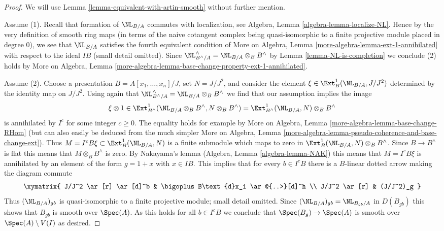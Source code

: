 \begin{proof}
We will use Lemma \ref{lemma-equivalent-with-artin-smooth}
without further mention.

\medskip\noindent
Assume (1). Recall that formation of $\NL_{B/A}$ commutes with
localization, see Algebra, Lemma \ref{algebra-lemma-localize-NL}.
Hence by the very definition of smooth ring maps (in terms of
the naive cotangent complex being quasi-isomorphic to a finite
projective module placed in degree $0$), we see that
$\NL_{B/A}$ satisfies the fourth equivalent condition
of More on Algebra, Lemma \ref{more-algebra-lemma-ext-1-annihilated}
with respect to the ideal $IB$ (small detail omitted).
Since $\NL_{B^\wedge/A}^\wedge = \NL_{B/A} \otimes_B B^\wedge$
by Lemma \ref{lemma-NL-is-completion} we conclude (2) holds by
More on Algebra, Lemma
\ref{more-algebra-lemma-base-change-property-ext-1-annihilated}.

\medskip\noindent
Assume (2). Choose a presentation
$B = A[x_1, \ldots, x_n]/J$, set $N = J/J^2$, and
consider the element $\xi \in \Ext^1_B(\NL_{B/A}, J/J^2)$
determined by the identity map on $J/J^2$.
Using again that $\NL_{B^\wedge/A}^\wedge = \NL_{B/A} \otimes_B B^\wedge$
we find that our assumption implies the image
$$
\xi \otimes 1 \in
\Ext^1_{B^\wedge}(\NL_{B/A} \otimes_B B^\wedge, N \otimes_B B^\wedge) =
\Ext^1_{B^\wedge}(\NL_{B/A}, N) \otimes_B B^\wedge
$$
is annihilated by $I^c$ for some integer $c \geq 0$.
The equality holds for example by
More on Algebra, Lemma \ref{more-algebra-lemma-base-change-RHom}
(but can also easily be deduced from the much simpler
More on Algebra, Lemma
\ref{more-algebra-lemma-pseudo-coherence-and-base-change-ext}).
Thus $M = I^cB\xi \subset \Ext^1_B(\NL_{B/A}, N)$ is a finite submodule
which maps to zero in $\Ext^1_B(\NL_{B/A}, N) \otimes_B B^\wedge$.
Since $B \to B^\wedge$ is flat this means that
$M \otimes_B B^\wedge$ is zero. By 
Nakayama's lemma (Algebra, Lemma \ref{algebra-lemma-NAK})
this means that $M = I^cB\xi$ is annihilated by an element
of the form $g = 1 + x$ with $x \in IB$.
This implies that for every $b \in I^cB$ there is a
$B$-linear dotted arrow making the diagram commute
$$
\xymatrix{
J/J^2 \ar[r] \ar[d]^b & \bigoplus B\text{d}x_i \ar@{..>}[d]^h \\
J/J^2 \ar[r] & (J/J^2)_g
}
$$
Thus $(\NL_{B/A})_{gb}$ is quasi-isomorphic
to a finite projective module; small detail omitted.
Since $(\NL_{B/A})_{gb} = \NL_{B_{gb}/A}$ in $D(B_{gb})$
this shows that $B_{gb}$ is smooth over $\Spec(A)$.
As this holds for all $b \in I^cB$ we conclude
that $\Spec(B_g) \to \Spec(A)$ is smooth over $\Spec(A) \setminus V(I)$
as desired.
\end{proof}


